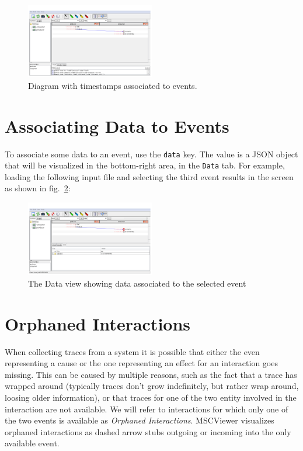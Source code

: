 \documentclass[11pt, twoside, titlepage]{book}
\newcommand{\prog}{MSCViewer}
\newcommand{\defterm}[1]{\textit{#1}\index{#1}}
\begin{document}
%
\begin{figure}[ht!]
  \centering
  \includegraphics[width=0.5\textwidth,natwidth=1024,natheight=600]{images/gui-ex4-time.png}
  \caption{Diagram with timestamps associated to events.}
  \label{fig:gui-lst4}
\end{figure} 


\section{Associating Data to Events}
To associate some data to an event, use the \texttt{data} key. The value is a
JSON object that will be visualized in the bottom-right area, in the
\texttt{Data} tab. For example, loading the following input file  and selecting
the third event results in the screen as shown in fig.~\ref{fig:gui-lst5}:

\begin{minipage}{\linewidth} 

\end{minipage}


\begin{figure}[ht!]
  \centering
  \includegraphics[width=0.5\textwidth,natwidth=1024,natheight=600]{images/gui-ex5-data.png}
  \caption{The Data view showing data associated to the selected event}
  \label{fig:gui-lst5}
\end{figure}

\section{Orphaned Interactions}
When collecting traces from a system it is possible that either the even
representing a cause or the one representing an effect for an interaction goes
missing. This can be caused by multiple reasons, such as the fact that a trace
has wrapped around (typically traces don't grow indefinitely, but rather wrap
around, loosing older information), or that traces for one of the two entity
involved in the interaction are not available. We will refer to interactions for
which only one of the two events is available as \defterm{Orphaned
Interactions}.
\prog{} visualizes orphaned interactions as dashed arrow stubs outgoing or
incoming into the only available event.
\end{document}
